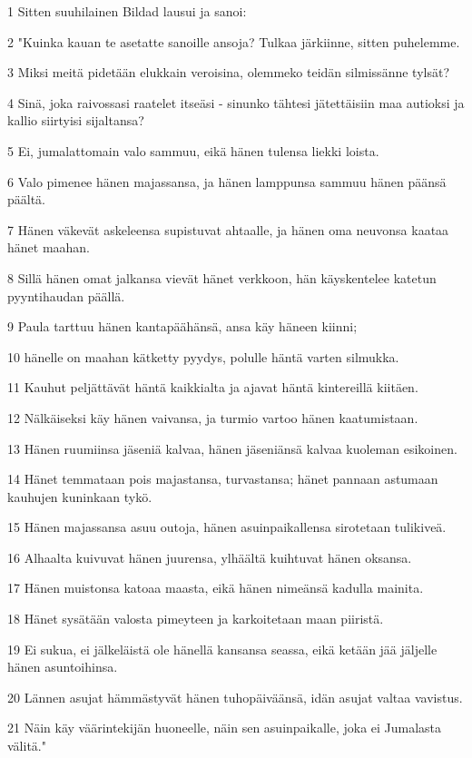 \par 1 Sitten suuhilainen Bildad lausui ja sanoi:
\par 2 "Kuinka kauan te asetatte sanoille ansoja? Tulkaa järkiinne, sitten puhelemme.
\par 3 Miksi meitä pidetään elukkain veroisina, olemmeko teidän silmissänne tylsät?
\par 4 Sinä, joka raivossasi raatelet itseäsi - sinunko tähtesi jätettäisiin maa autioksi ja kallio siirtyisi sijaltansa?
\par 5 Ei, jumalattomain valo sammuu, eikä hänen tulensa liekki loista.
\par 6 Valo pimenee hänen majassansa, ja hänen lamppunsa sammuu hänen päänsä päältä.
\par 7 Hänen väkevät askeleensa supistuvat ahtaalle, ja hänen oma neuvonsa kaataa hänet maahan.
\par 8 Sillä hänen omat jalkansa vievät hänet verkkoon, hän käyskentelee katetun pyyntihaudan päällä.
\par 9 Paula tarttuu hänen kantapäähänsä, ansa käy häneen kiinni;
\par 10 hänelle on maahan kätketty pyydys, polulle häntä varten silmukka.
\par 11 Kauhut peljättävät häntä kaikkialta ja ajavat häntä kintereillä kiitäen.
\par 12 Nälkäiseksi käy hänen vaivansa, ja turmio vartoo hänen kaatumistaan.
\par 13 Hänen ruumiinsa jäseniä kalvaa, hänen jäseniänsä kalvaa kuoleman esikoinen.
\par 14 Hänet temmataan pois majastansa, turvastansa; hänet pannaan astumaan kauhujen kuninkaan tykö.
\par 15 Hänen majassansa asuu outoja, hänen asuinpaikallensa sirotetaan tulikiveä.
\par 16 Alhaalta kuivuvat hänen juurensa, ylhäältä kuihtuvat hänen oksansa.
\par 17 Hänen muistonsa katoaa maasta, eikä hänen nimeänsä kadulla mainita.
\par 18 Hänet sysätään valosta pimeyteen ja karkoitetaan maan piiristä.
\par 19 Ei sukua, ei jälkeläistä ole hänellä kansansa seassa, eikä ketään jää jäljelle hänen asuntoihinsa.
\par 20 Lännen asujat hämmästyvät hänen tuhopäiväänsä, idän asujat valtaa vavistus.
\par 21 Näin käy väärintekijän huoneelle, näin sen asuinpaikalle, joka ei Jumalasta välitä."

